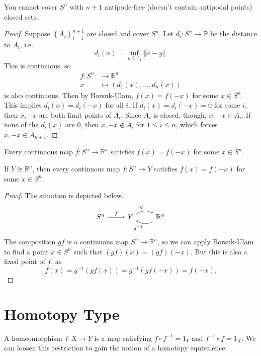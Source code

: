\documentclass[twoside,10pt]{report}
\begin{document}
\begin{cor}
	You cannot cover $S^{n}$ with $n+1$ antipode-free (doesn't contain antipodal points) closed sets.
\end{cor}
\begin{proof}
	Suppose $\left\{ A_i \right\}_{i=1}^{n+1}$ are closed and cover $S^{n}$. Let $d_i:S^{n}\to \mathbb{R}$ be the distance to $A_{i}$, i.e.
	\[
		d_i(x) = \inf_{y \in A_{i}}{\Vert{x-y}\Vert}.
	\] This is continuous, so
	\begin{align*}
		f:S^{n}&\to \mathbb{R}^{n}\\
		x&\mapsto (d_1(x), \dots, d_{n}(x))
	\end{align*}
	is also continuous. Then by Borsuk-Ulam, $f(x)=f(-x)$ for some $x \in S^{n}$. This implies $d_{i}(x)=d_{i}(-x)$ for all $i$. If $d_i(x)=d_i(-x)=0$ for some $i$, then $x,-x$ are both limit points of $A_i$. Since $A_i$ is closed, though, $x,-x \in A_i$. If none of the $d_i(x)$ are 0, then $x,-x \not\in A_i$ for $1 \leq i \leq n$, which forces $x,-x \in A_{n+1}$.
\end{proof}

\begin{thrm}
	Every continuous map $f:S^{n}\to \mathbb{R}^{n}$ satisfies $f(x)=f(-x)$ for some $x \in S^{n}$.
\end{thrm}

\begin{cor}
	If $Y \cong \mathbb{R}^{n}$, then every continuous map $f:S^{n}\to Y$ satisfies $f(x)=f(-x)$ for some $x \in S^{n}$.
\end{cor}
\begin{proof}
	The situation is depicted below.
	\[
	\begin{tikzcd}
		S^{n}\rar{f}&Y\rar[bend left]{g}&\mathbb{R}^{n}\lar[bend left]{g^{-1}}
	\end{tikzcd}
\] The composition $gf$ is a continuous map $S^{n}\to \mathbb{R}^{n}$, so we can apply Borsuk-Ulam to find a point $x \in S^{n}$ such that $(gf)(x)=(gf)(-x)$. But this is also a fixed point of $f$, as
\[
	f(x) = g^{-1}(gf(x)) = g^{-1}(gf(-x)) = f(-x).
\] 
\end{proof}


\section{Homotopy Type}

A homeomorphism $f:X\to Y$ is a map satisfying $f \circ f^{-1}=1_{Y}$ and $f^{-1} \circ f=1_{X}$. We can loosen this restriction to gain the notion of a homotopy equivalence.
\end{document}
